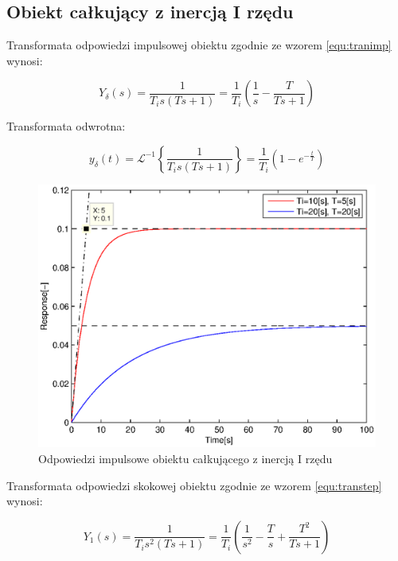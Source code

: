 \documentclass[12pt]{article}
\begin{document}
\subsection{Obiekt całkujący z inercją I rzędu}

Transformata odpowiedzi impulsowej obiektu zgodnie ze wzorem \eqref{equ:tranimp}
wynosi:

\begin{equation*}
	Y_{\delta}(s)=\frac{1}{T_is(Ts+1)}=\frac{1}{T_i}\left(\frac{1}{s} -
	\frac{T}{Ts+1}\right)
\end{equation*}

Transformata odwrotna:

\begin{equation*}
	y_{\delta}(t)=\mathcal{L}^{-1}\left\{\frac{1}{T_is(Ts+1)}\right\} =
	\frac{1}{T_i}\left(1-e^{-\frac{t}{T}}\right)
\end{equation*}

\begin{figure}[!htb]
	\begin{center}
		\includegraphics[width=14cm]{../res/img/imp4.eps}
	\end{center}
	\caption{Odpowiedzi impulsowe obiektu całkującego z inercją I rzędu}
\end{figure}

\newpage

Transformata odpowiedzi skokowej obiektu zgodnie ze wzorem \eqref{equ:transtep}
wynosi:

\begin{equation*}
	Y_{1}(s)=\frac{1}{T_is^2(Ts+1)}=\frac{1}{T_i}\left(\frac{1}{s^2} -
	\frac{T}{s} +	\frac{T^2}{Ts+1}\right)
\end{equation*}
\end{document}
